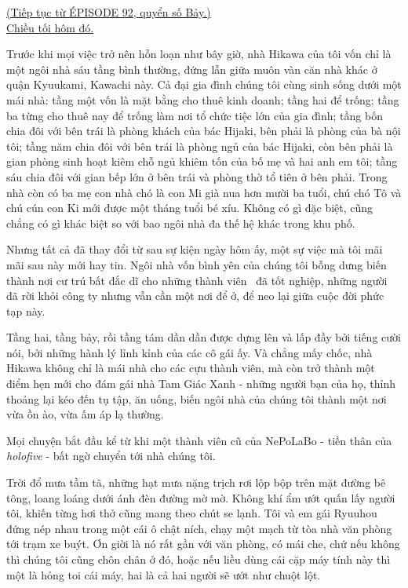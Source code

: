 \documentclass[../main.tex]{subfiles}
\begin{document}
\begin{center}
  \uline{(Tiếp tục từ {\flaregothic ÉPISODE 92}, quyển số Bảy.)\\Chiều tối hôm đó.}
\end{center}


Trước khi mọi việc trở nên hỗn loạn như bây giờ, nhà Hikawa của tôi vốn chỉ là một ngôi nhà sáu tầng bình thường, đứng lẫn giữa muôn vàn căn nhà khác ở quận Kyuukami, Kawachi này. Cả đại gia đình chúng tôi cùng sinh sống dưới một mái nhà: tầng một vốn là mặt bằng cho thuê kinh doanh; tầng hai để trống; tầng ba từng cho thuê nay để trống làm nơi tổ chức tiệc lớn của gia đình; tầng bốn chia đôi với bên trái là phòng khách của bác Hijaki, bên phải là phòng của bà nội tôi; tầng năm chia đôi với bên trái là phòng ngủ của bác Hijaki, còn bên phải là gian phòng sinh hoạt kiêm chỗ ngủ khiêm tốn của bố mẹ và hai anh em tôi; tầng sáu chia đôi với gian bếp lớn ở bên trái và phòng thờ tổ tiên ở bên phải. Trong nhà còn có ba mẹ con nhà chó là con Mi già nua hơn mười ba tuổi, chú chó Tô và chú cún con Ki mới được một tháng tuổi bé xíu. Không có gì đặc biệt, cũng chẳng có gì khác biệt so với bao ngôi nhà đa thế hệ khác trong khu phố.

Nhưng tất cả đã thay đổi từ sau sự kiện ngày hôm ấy, một sự việc mà tôi mãi mãi sau này mới hay tin. Ngôi nhà vốn bình yên của chúng tôi bỗng dưng biến thành nơi cư trú bất đắc dĩ cho những thành viên \hll\ đã tốt nghiệp, những người đã rời khỏi công ty nhưng vẫn cần một nơi để ở, để neo lại giữa cuộc đời phức tạp này.

Tầng hai, tầng bảy, rồi tầng tám dần dần được dựng lên và lấp đầy bởi tiếng cười nói, bởi những hành lý lỉnh kỉnh của các cô gái ấy. Và chẳng mấy chốc, nhà Hikawa không chỉ là mái nhà cho các cựu thành viên, mà còn trở thành một điểm hẹn mới cho đám gái nhà Tam Giác Xanh - những người bạn của họ, thỉnh thoảng lại kéo đến tụ tập, ăn uống, biến ngôi nhà của chúng tôi thành một nơi vừa ồn ào, vừa ấm áp lạ thường.

Mọi chuyện bắt đầu kể từ khi một thành viên cũ của NePoLaBo - tiền thân của \textit{holofive} - bất ngờ chuyển tới nhà chúng tôi.

\il

Trời đổ mưa tầm tã, những hạt mưa nặng trịch rơi lộp bộp trên mặt đường bê tông, loang loáng dưới ánh đèn đường mờ mờ. Không khí ẩm ướt quấn lấy người tôi, khiến từng hơi thở cũng mang theo chút se lạnh. Tôi và em gái Ryuuhou đứng nép nhau trong một cái ô chật ních, chạy một mạch từ tòa nhà văn phòng tới trạm xe buýt. Ơn giời là nó rất gần với văn phòng, có mái che, chứ nếu không thì chúng tôi cũng chôn chân ở đó, hoặc nếu liều dùng cái cặp máy tính này thì một là hỏng toi cái máy, hai là cả hai người sẽ ướt như chuột lột.
\end{document}
